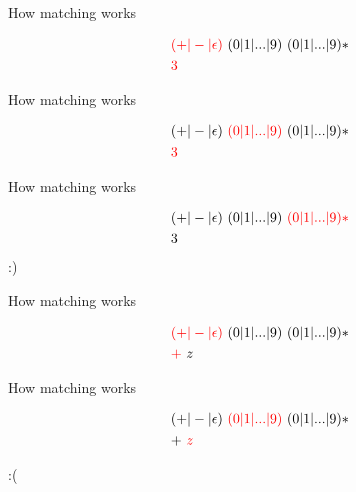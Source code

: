 \documentclass{beamer}
\renewcommand\big[1]{
  \begin{center}
    \Large{#1}
  \end{center}
}
\begin{document}
\begin{frame}
  \big{How matching works}

  \begin{align*}
    & \textcolor{red}{(+ \vert - \vert \epsilon)}~(0 \vert 1 \vert ... \vert 9)~(0 \vert 1 \vert ... \vert 9)* \\
    & \textcolor{red}{3}
  \end{align*}
\end{frame}


\begin{frame}
  \big{How matching works}

  \begin{align*}
    & (+ \vert - \vert \epsilon)~\textcolor{red}{(0 \vert 1 \vert ... \vert 9)}~(0 \vert 1 \vert ... \vert 9)*\\
    & \textcolor{red}{3}
  \end{align*}
\end{frame}


\begin{frame}
  \big{How matching works}

  \begin{align*}
    & (+ \vert - \vert \epsilon)~(0 \vert 1 \vert ... \vert 9)~\textcolor{red}{(0 \vert 1 \vert ... \vert 9)*} \\
    & 3
  \end{align*}
  \centering\Huge{:)}
\end{frame}

\begin{frame}
  \big{How matching works}

  \begin{align*}
    & \textcolor{red}{(+ \vert - \vert \epsilon)}~(0 \vert 1 \vert ... \vert 9)~(0 \vert 1 \vert ... \vert 9)* \\
    & \textcolor{red}{+}~{z}
  \end{align*}
\end{frame}

\begin{frame}
  \big{How matching works}

  \begin{align*}
    & (+ \vert - \vert \epsilon)~\textcolor{red}{(0 \vert 1 \vert ... \vert 9)}~(0 \vert 1 \vert ... \vert 9)* \\
    & {+}~\textcolor{red}{z}
  \end{align*}

  \centering\Huge{:(}
\end{frame}
\end{document}
